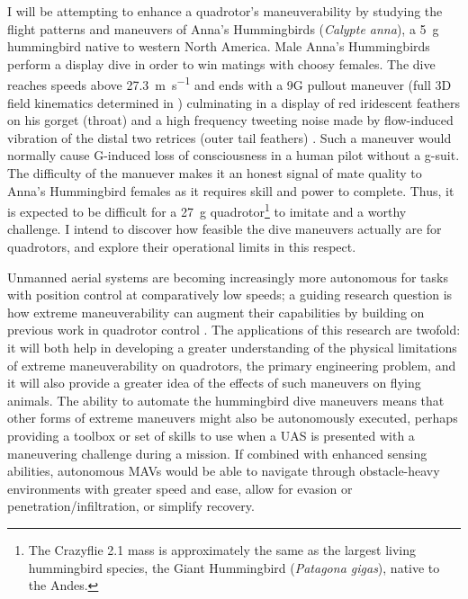 \documentclass[onecolumn,10pt]{IEEEtran}
\newcommand{\Calypteanna}{\emph{Calypte anna}}
\begin{document}
I will be attempting to enhance a quadrotor’s maneuverability by studying the flight patterns and maneuvers of Anna’s Hummingbirds (\Calypteanna), a \SI{5}{\gram} hummingbird native to western North America. Male Anna's Hummingbirds perform a display dive in order to win matings with choosy females. The dive reaches speeds above \SI{27.3}{\meter\per\second} \cite{clark2009courtship}
 and ends with a 9G pullout maneuver (full 3D field kinematics determined in \cite{clark2009courtship}) culminating in a display of red iridescent feathers on his gorget (throat) and a high frequency tweeting noise made by flow-induced vibration of the distal two retrices (outer tail feathers) \cite{clark2008annas}. Such a maneuver would normally cause G-induced loss of consciousness in a human pilot without a g-suit.  The difficulty of the manuever makes it an honest signal \cite{zahavi1975mate} of mate quality to Anna's Hummingbird females as it requires skill and power to complete. Thus, it is expected to be difficult for a \SI{27}{\gram} quadrotor\footnote{The Crazyflie 2.1 mass is approximately the same as the largest living hummingbird species, the Giant Hummingbird (\emph{Patagona gigas}), native to the Andes.}  to imitate and a worthy challenge. I intend to discover how feasible the dive maneuvers actually are for quadrotors, and explore their operational limits in this respect. 

Unmanned aerial systems are becoming increasingly more autonomous for tasks with position control at comparatively low speeds; a guiding research question is how extreme maneuverability can augment their capabilities by building on previous work in quadrotor control  \cite{mellinger2011minimum, greiff2017modelling}.  The applications of this research are twofold: it will both help in developing a greater understanding of the physical limitations of extreme maneuverability on quadrotors, the primary engineering problem, and it will also provide a greater idea of the effects of such maneuvers on flying animals. The ability to automate the hummingbird dive maneuvers means that other forms of extreme maneuvers might also be autonomously executed, perhaps providing a toolbox or set of skills to use when a UAS is presented with a maneuvering challenge during a mission.  If combined with enhanced sensing abilities, autonomous MAVs would be able to navigate through obstacle-heavy environments with greater speed and ease, allow for evasion or penetration/infiltration, or simplify recovery. 
\end{document}

